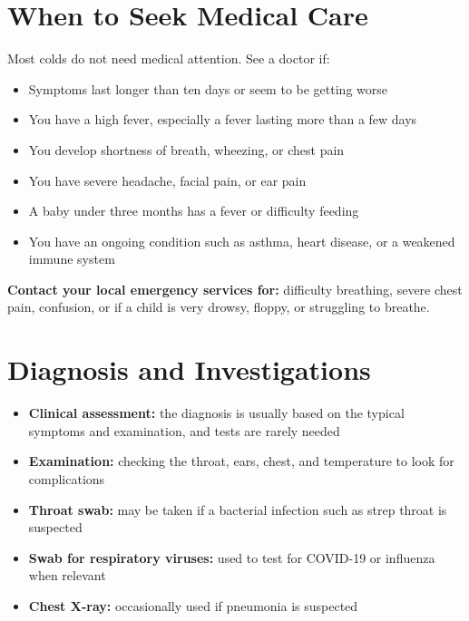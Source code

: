 \section*{When to Seek Medical Care}
Most colds do not need medical attention. See a doctor if:

\begin{itemize}
    \item Symptoms last longer than ten days or seem to be getting worse
    \item You have a high fever, especially a fever lasting more than a few days
    \item You develop shortness of breath, wheezing, or chest pain
    \item You have severe headache, facial pain, or ear pain
    \item A baby under three months has a fever or difficulty feeding
    \item You have an ongoing condition such as asthma, heart disease, or a weakened immune system
\end{itemize}

\textbf{Contact your local emergency services for:} difficulty breathing, severe chest pain, confusion, or if a child is very drowsy, floppy, or struggling to breathe.

\section*{Diagnosis and Investigations}
\begin{itemize}
    \item \textbf{Clinical assessment:} the diagnosis is usually based on the typical symptoms and examination, and tests are rarely needed
    \item \textbf{Examination:} checking the throat, ears, chest, and temperature to look for complications
    \item \textbf{Throat swab:} may be taken if a bacterial infection such as strep throat is suspected
    \item \textbf{Swab for respiratory viruses:} used to test for COVID-19 or influenza when relevant
    \item \textbf{Chest X-ray:} occasionally used if pneumonia is suspected
\end{itemize}

